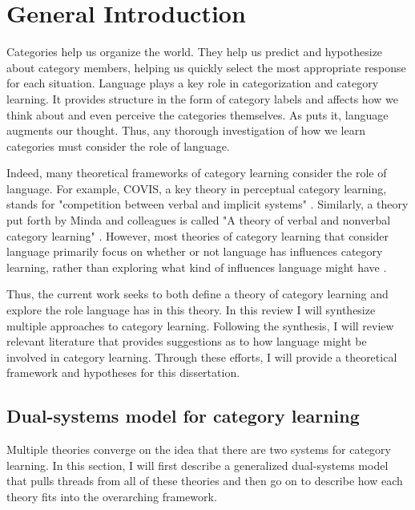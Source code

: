 \documentclass[../dissertation.tex]{subfiles}
\begin{document}
\section{General Introduction}

	Categories help us organize the world. They help us predict and hypothesize about category members, helping us quickly select the most appropriate response for each situation. Language plays a key role in categorization and category learning. It provides structure in the form of category labels and affects how we think about and even perceive the categories themselves. As \citet{Lupyan2012} puts it, language augments our thought. Thus, any thorough investigation of how we learn categories must consider the role of language. \par
	Indeed, many theoretical frameworks of category learning consider the role of language. For example, COVIS, a key theory in perceptual category learning, stands for "competition between verbal and implicit systems" \citep{Ashby1998}. Similarly, a theory put forth by Minda and colleagues is called "A theory of verbal and nonverbal category learning" \citep{Minda2010}. However, most theories of category learning that consider language primarily focus on whether or not language has influences category learning, rather than exploring what kind of influences language might have .\par
	Thus, the current work seeks to both define a theory of category learning and explore the role language has in this theory. In this review I will synthesize multiple approaches to category learning. Following the synthesis, I will review relevant literature that provides suggestions as to how language might be involved in category learning. Through these efforts, I will provide a theoretical framework and hypotheses for this dissertation.

\subsection{Dual-systems model for category learning}
	Multiple theories converge on the idea that there are two systems for category learning. In this section, I will first describe a generalized dual-systems model that pulls threads from all of these theories and then go on to describe how each theory fits into the overarching framework. 
	
\end{document}
